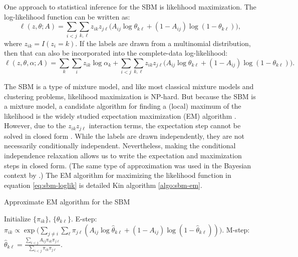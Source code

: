 \documentclass[
  12pt,
]{article}
\theoremstyle{definition}
\theoremstyle{definition}
\theoremstyle{definition}
\theoremstyle{definition}
\theoremstyle{remark}
\begin{document}
One approach to statistical inference for the SBM is likelihood maximization.
The log-likelihood function can be written as:
\begin{equation}
\label{eq:sbm-loglik}
\ell(z, \theta; A) = \sum_{i < j} \sum_{k, \ell} z_{ik} z_{j \ell} \big( 
A_{ij} \log \theta_{k \ell} + (1 - A_{ij}) \log (1 - \theta_{k \ell}) \big),
\end{equation}
where \(z_{ik} = I(z_i = k)\). If the labels are drawn from a multinomial distribution, then that can also be incorporated into the complete-data log-likelihood:
\begin{equation}
\label{eq:sbm-loglik-full}
\ell(z, \theta, \alpha; A) = \sum_k \sum_i z_{ik} \log \alpha_k + 
\sum_{i < j} \sum_{k, \ell} z_{ik} z_{j \ell} \big( 
A_{ij} \log \theta_{k \ell} + (1 - A_{ij}) \log (1 - \theta_{k \ell}) \big).
\end{equation}

The SBM is a type of mixture model, and like most classical mixture models and clustering problems, likelihood maximization is NP-hard.
But because the SBM is a mixture model, a candidate algorithm for finding a (local) maximum of the likelihood is the widely studied expectation maximization (EM) algorithm \citep{10.2307/2984875}.
However, due to the \(z_{ik} z_{j \ell}\) interaction terms, the expectation step cannot be solved in closed form \citep{kolaczyk2014statistical}.
While the labels are drawn independently, they are not necessarily conditionally independent.
Nevertheless, making the conditional independence relaxation allows us to write the expectation and maximization steps in closed form.
(The same type of approximation was used in the Bayesian context by \citet{10.2307/43974715}.)
The EM algorithm for maximizing the likelihood function in equation \eqref{eq:sbm-loglik} is detailed Kin algorithm \ref{algo:sbm-em}.

\begin{algorithm}
  \label{algo:sbm-em}
  \DontPrintSemicolon
  \SetAlgoLined
  \caption{Approximate EM algorithm for the SBM}
  Initialize $\{\pi_{ik}\}$, $\{\theta_{k \ell}\}$.\;
  \While{$\|\nabla \ell\| > \epsilon$} {
     {
       {
      E-step: $\pi_{ik} \propto \exp \bigg( \sum_{j \neq i} \sum_{\ell} \pi_{j \ell} (A_{ij} \log \hat{\theta}_{k \ell} + (1 - A_{ij}) \log (1 - \hat{\theta}_{k \ell})) \bigg)$.\;
      }
    }
     {
       {
        M-step: $\hat{\theta}_{k \ell} = \frac{\sum_{i < j} A_{ij} \pi_{ik} \pi_{j \ell}}{\sum_{i < j} \pi_{ik} \pi_{j \ell}}$.\;
      }
    }
  }
\end{algorithm}
\end{document}
